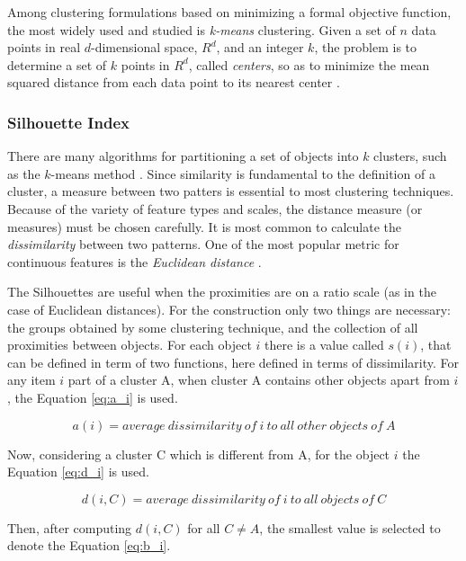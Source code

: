 \documentclass[journal]{IEEEtran}
\begin{document}
Among clustering formulations based on minimizing a formal objective function, the most widely used and studied is \textit{k-means} clustering. Given a set of $n$ data points in real $d$-dimensional space, $R^d$, and an integer $k$, the problem is to determine a set of $k$ points in $R^d$, called \textit{centers}, so as to minimize the mean squared distance from each data point to its nearest center \cite{kanungo2002efficient}.

\subsubsection{Silhouette Index}

There are many algorithms for partitioning a set of objects into $k$ clusters, such as the $k$-means method \cite{kanungo2002efficient}. Since similarity is fundamental to the definition of a cluster, a measure between two patters is essential to most clustering techniques. Because of the variety of feature types and scales, the distance measure (or measures) must be chosen carefully. It is most common to calculate the \textit{dissimilarity} between two patterns. One of the most popular metric for continuous features is the \textit{Euclidean distance} \cite{jain1988algorithms}.

The Silhouettes are useful when the proximities are on a ratio scale (as in the case of Euclidean distances). For the construction only two things are necessary: the groups obtained by some clustering technique, and the collection of all proximities between objects. For each object $i$ there is a value called $s(i)$, that can be defined in term of two functions, here defined in terms of dissimilarity. For any item $i$ part of a cluster A, when cluster A contains other objects apart from $i$, the Equation \ref{eq:a_i} is used.

\begin{equation} \label{eq:a_i}
a(i) = average~dissimilarity~of~i~to~all~other~objects~of~A
\end{equation}

Now, considering a cluster C which is different from A, for the object $i$ the Equation \ref{eq:d_i} is used.

\begin{equation} \label{eq:d_i}
d(i, C) = average~dissimilarity~of~i~to~all~objects~of~C
\end{equation}

Then, after computing $d(i, C)$ for all $C \neq A$, the smallest value is selected to denote the Equation \ref{eq:b_i}.
\end{document}
